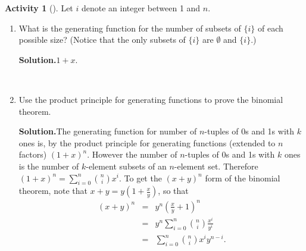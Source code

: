 \documentclass[10pt,]{book}
\theoremstyle{plain}
\theoremstyle{definition}
\newtheorem{activity}[project]{Activity}
\numberwithin{equation}{chapter}
\newcommand{\amp}{&}
\begin{document}
\begin{activity}[]\label{activity-165}
Let \(i\) denote an integer between 1 and \(n\).%
~\par
\begin{enumerate}[label=(\alph*)]
 \item What is the generating function for the number of subsets of \(\{i\}\) of each possible size? (Notice that the only subsets of \(\{i\}\) are \(\emptyset\) and \(\{i\}\).)%
\par\medskip\noindent%
\textbf{Solution.}\quad \(1+x\).%

~\par
\item Use the product principle for generating functions to prove the binomial theorem.%
\par\medskip\noindent%
\textbf{Solution.}\quad The generating function for number of \(n\)-tuples of 0s and 1s with \(k\) ones is, by the product principle for generating functions (extended to \(n\) factors) \((1+x)^n\). However the number of \(n\)-tuples of 0s and 1s with \(k\) ones is the number of \(k\)-element subsets of an \(n\)-element set. Therefore \((1+x)^n =\sum_{i=0}^n \binom{n}{i}x^i\). To get the \((x+y)^n\) form of the binomial theorem, note that \(x+y = y(1+\frac{x}{y})\), so that%
\begin{align*}
(x+y)^n \amp =\amp  y^n\left(\frac{x}{y}+1\right)^n\\
\amp =\amp y^n\sum_{i=0}^n \binom{n}{i}\frac{x^i}{y^i}\\
\amp =\amp  \sum_{i=0}^n\binom{n}{i}x^iy^{n-i}.
\end{align*}
%

\end{enumerate}
\end{activity}
\typeout{************************************************}
\typeout{************************************************}
\end{document}
